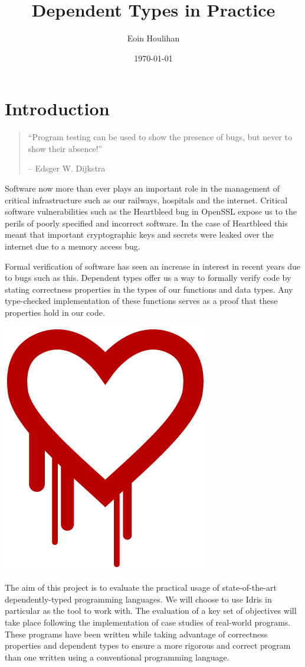 \documentclass[a4paper, notitlepage]{report}
\author{Eoin Houlihan}
\date{\today}
\title{Dependent Types in Practice}
\begin{document}
\inserttitlepage
{}
\declaration
\permissiontolend
\insertabstract
\acknowledgements
\tableofcontents
\newpage
\pagestyle{headings}

\chapter{Introduction}
\label{sec:org92cc981}
\begin{quote}
``Program testing can be used to show the presence of bugs, but never to show
their absence!''

-- Edsger W. Dijkstra
\end{quote}

Software now more than ever plays an important role in the management of
critical infrastructure such as our railways, hospitals and the internet.
Critical software vulnerabilities such as the Heartbleed \cite{heartbleed_2014}
bug in OpenSSL expose us to the perils of poorly specified and incorrect
software. In the case of Heartbleed this meant that important cryptographic keys
and secrets were leaked over the internet due to a memory access bug.

Formal verification of software has seen an increase in interest in recent years
due to bugs such as this. Dependent types offer us a way to formally verify code
by stating correctness properties in the types of our functions and data types.
Any type-checked implementation of these functions serves as a proof that these
properties hold in our code.

\begin{center}
\includegraphics[width=0.35\linewidth]{./fig/heartbleed.png}
\end{center}

The aim of this project is to evaluate the practical usage of state-of-the-art
dependently-typed programming languages. We will choose to use Idris in
particular as the tool to work with. The evaluation of a key set of objectives
will take place following the implementation of case studies of real-world
programs. These programs have been written while taking advantage of correctness
properties and dependent types to ensure a more rigorous and correct program
than one written using a conventional programming language.
\end{document}
